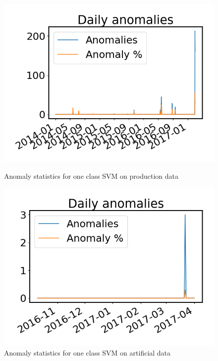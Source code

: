         \begin{figure}[h!]
            \begin{minipage}[b]{0.49\linewidth}
                \centering
                \includegraphics[width=\textwidth]{report/figures/analysis/plant2_train_short/daily_svm_outliers_production_small.png}
                \caption{Anomaly statistics for one class SVM on production data}
                \label{fig:svm_2_outliers_stats_production}
            \end{minipage}
            \hfill\vline\hfill
            \begin{minipage}[b]{0.49\linewidth}
                \centering
                \includegraphics[width=\textwidth]{report/figures/analysis/plant2_train_short/daily_svm_outliers_artificial_small.png}
                \caption{Anomaly statistics for one class SVM on artificial data}
                \label{fig:svm_2_outliers_stats_artificial}
            \end{minipage}
        \end{figure}
        
